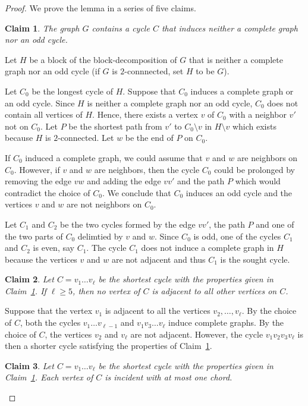 \documentclass[10pt]{article}
\newtheorem{claim}{Claim}
\begin{document}
\begin{proof}
We prove the lemma in a series of five claims.
\begin{claim}
\label{cl-1}
The graph $G$ contains a cycle $C$ that induces neither a complete graph nor an odd cycle.
\end{claim}
Let $H$ be a block of the block-decomposition of $G$ that
is neither a complete graph nor an odd cycle (if $G$ is $2$-connnected, set $H$ to be $G$).

Let $C_0$ be the longest cycle of $H$.
Suppose that $C_0$ induces a complete graph or an odd cycle.
Since $H$ is neither a complete graph nor an odd cycle,
$C_0$ does not contain all vertices of $H$.
Hence, there exists a vertex $v$ of $C_0$ with a neighbor $v'$ not on $C_0$.
Let $P$ be the shortest path from $v'$ to $C_0\setminus v$ in $H\setminus v$
which exists because $H$ is $2$-connected. Let $w$ be the end of $P$ on $C_0$.

If $C_0$ induced a complete graph, we could assume that
$v$ and $w$ are neighbors on $C_0$. However, if $v$ and $w$ are neighbors,
then the cycle $C_0$ could be prolonged by removing the edge $vw$ and
adding the edge $vv'$ and the path $P$
which would contradict the choice of $C_0$.
We conclude that $C_0$ induces an odd cycle and
the vertices $v$ and $w$ are not neighbors on $C_0$.

Let $C_1$ and $C_2$ be the two cycles formed by the edge $vv'$, the path $P$ and
one of the two parts of $C_0$ delimtied by $v$ and $w$. Since $C_0$ is odd,
one of the cycles $C_1$ and $C_2$ is even, say $C_1$. The cycle $C_1$ does not
induce a complete graph in $H$ because the vertices $v$ and $w$ are not adjacent and
thus $C_1$ is the sought cycle.

\begin{claim}
\label{cl-2}
Let $C=v_1\ldots v_{\ell}$ be the shortest cycle with the properties given in Claim~\ref{cl-1}.
If $\ell\ge 5$, then no vertex of $C$ is adjacent to all other vertices on $C$.
\end{claim}

Suppose that the vertex $v_1$ is adjacent to all the vertices $v_2,\ldots,v_{\ell}$.
By the choice of $C$, both the cycles $v_1\ldots v_{\ell-1}$ and $v_1v_3\ldots v_{\ell}$
induce complete graphs. By the choice of $C$, the vertices $v_2$ and $v_{\ell}$ are not adjacent.
However, the cycle $v_1v_2v_3v_{\ell}$ is then a shorter cycle satisfying the properties of Claim~\ref{cl-1}.

\begin{claim}
\label{cl-3}
Let $C=v_1\ldots v_{\ell}$ be the shortest cycle with the properties given in Claim~\ref{cl-1}.
Each vertex of $C$ is incident with at most one chord.
\end{claim}


\end{proof}
\end{document}
